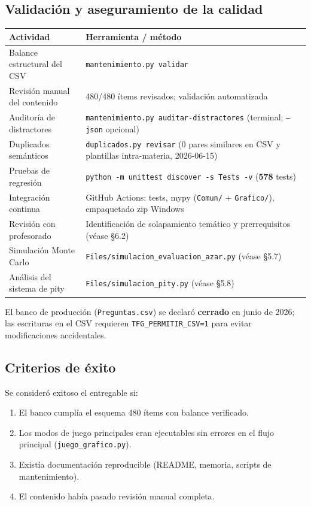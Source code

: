 \documentclass[11pt,a4paper]{article}
\newcommand{\iniciotabla}{\par\medskip\renewcommand{\arraystretch}{1.12}}
\newcommand{\fintabla}{\par\medskip}
\begin{document}
\subsection{Validación y aseguramiento de la calidad}

\iniciotabla
\begin{tabular}{@{}lp{8cm}@{}}
\toprule
\textbf{Actividad} & \textbf{Herramienta / método} \\
\midrule
Balance estructural del CSV & \texttt{mantenimiento.py validar} \\
Revisión manual del contenido & 480/480 ítems revisados; validación automatizada \\
Auditoría de distractores & \texttt{mantenimiento.py auditar-distractores} (terminal; \texttt{--json} opcional) \\
Duplicados semánticos & \texttt{duplicados.py revisar} (0 pares similares en CSV y plantillas intra-materia, 2026-06-15) \\
Pruebas de regresión & \texttt{python -m unittest discover -s Tests -v} (\textbf{578} tests) \\
Integración continua & GitHub Actions: tests, mypy (\texttt{Comun/} + \texttt{Grafico/}), empaquetado zip Windows \\
Revisión con profesorado & Identificación de solapamiento temático y prerrequisitos (véase §6.2) \\
Simulación Monte Carlo & \texttt{Files/simulacion\_evaluacion\_azar.py} (véase §5.7) \\
Análisis del sistema de pity & \texttt{Files/simulacion\_pity.py} (véase §5.8) \\
\bottomrule
\end{tabular}
\fintabla

El banco de producción (\texttt{Preguntas.csv}) se declaró \textbf{cerrado} en junio de 2026; las escrituras en el CSV requieren \texttt{TFG\_PERMITIR\_CSV=1} para evitar modificaciones accidentales.

\subsection{Criterios de éxito}

Se consideró exitoso el entregable si:
\begin{enumerate}
  \item El banco cumplía el esquema 480 ítems con balance verificado.
  \item Los modos de juego principales eran ejecutables sin errores en el flujo principal (\texttt{juego\_grafico.py}).
  \item Existía documentación reproducible (README, memoria, scripts de mantenimiento).
  \item El contenido había pasado revisión manual completa.
\end{enumerate}
\end{document}
